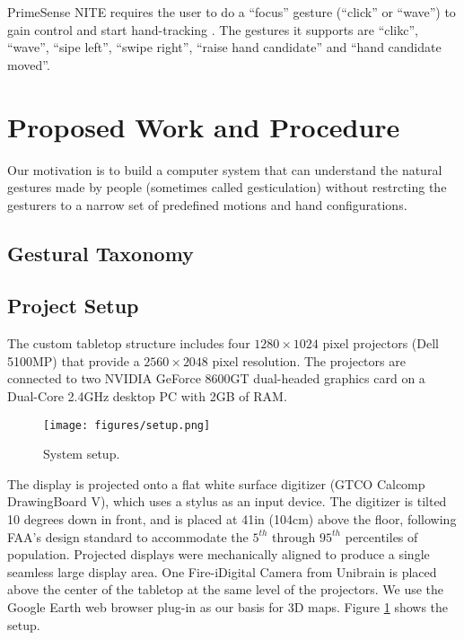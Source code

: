 PrimeSense NITE requires the user to do a ``focus'' gesture (``click'' or
``wave'') to gain control and start hand-tracking \cite{Primesense}. The
gestures it supports are ``clikc'', ``wave'', ``sipe left'', ``swipe right'', ``raise
hand candidate'' and ``hand candidate moved''.

\section{Proposed Work and Procedure}
Our motivation is to build a computer system that can understand the natural
gestures made by people (sometimes called gesticulation) without restrcting the
gesturers to a narrow set of predefined motions and hand configurations.

\subsection{Gestural Taxonomy}

\subsection{Project Setup}
The custom tabletop structure includes four $1280\times1024$ pixel projectors (Dell 5100MP) that provide a $2560\times2048$ pixel resolution. The projectors are connected to two NVIDIA GeForce 8600GT dual-headed graphics card on a Dual-Core 2.4GHz desktop PC with 2GB of RAM.

\begin{figure}
	\centering
	\texttt{[image: figures/setup.png]} 
	\caption{System setup.} \label{fig:setup}
\end{figure}

The display is projected onto a flat white surface digitizer (GTCO Calcomp DrawingBoard V), which uses a stylus as an input device. The digitizer is tilted 10 degrees down in front, and is placed at 41in (104cm) above the floor, following FAA's design standard to accommodate the $5^{th}$ through $95^{th}$ percentiles of population. Projected displays were mechanically aligned to produce a single seamless large display area. One Fire-i\texttrademark Digital Camera from Unibrain is placed above the center of the tabletop at the same level of the projectors. We use the Google Earth web browser plug-in as our basis for 3D maps. Figure \ref{fig:setup} shows the setup.

